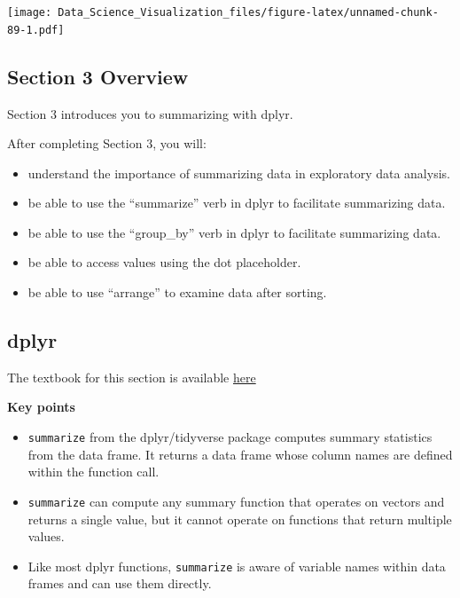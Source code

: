 \documentclass[
]{article}
\providecommand{\tightlist}{%
  \setlength{\itemsep}{0pt}\setlength{\parskip}{0pt}}
\begin{document}
\texttt{[image: Data\_Science\_Visualization\_files/figure-latex/unnamed-chunk-89-1.pdf]}

\hypertarget{section-3-overview}{%
\subsection{Section 3 Overview}\label{section-3-overview}}

Section 3 introduces you to summarizing with dplyr.

After completing Section 3, you will:

\begin{itemize}
\tightlist
\item
  understand the importance of summarizing data in exploratory data
  analysis.
\item
  be able to use the ``summarize'' verb in dplyr to facilitate
  summarizing data.
\item
  be able to use the ``group\_by'' verb in dplyr to facilitate
  summarizing data.
\item
  be able to access values using the dot placeholder.
\item
  be able to use ``arrange'' to examine data after sorting.
\end{itemize}

\hypertarget{dplyr}{%
\subsection{dplyr}\label{dplyr}}

The textbook for this section is available
\href{https://rafalab.github.io/dsbook/tidyverse.html\#summarizing-data}{here}

\textbf{Key points}

\begin{itemize}
\tightlist
\item
  \texttt{summarize} from the dplyr/tidyverse package computes summary
  statistics from the data frame. It returns a data frame whose column
  names are defined within the function call.
\item
  \texttt{summarize} can compute any summary function that operates on
  vectors and returns a single value, but it cannot operate on functions
  that return multiple values.
\item
  Like most dplyr functions, \texttt{summarize} is aware of variable
  names within data frames and can use them directly.
\end{itemize}
\end{document}
